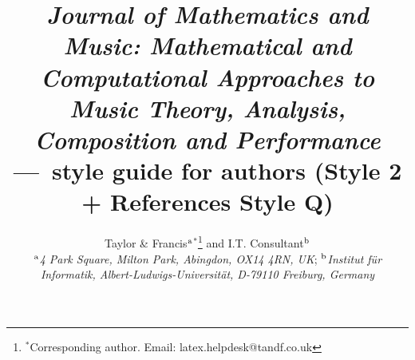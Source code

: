 \documentclass[]{tMAM2e}
\begin{document}
  

    



\title{{\itshape Journal of Mathematics and Music: Mathematical and Computational Approaches to Music Theory, Analysis, Composition and Performance}---\LaTeXe\ style guide for authors (Style 2 + References Style Q)}

\author{Taylor \& Francis$^{\rm a}$$^{\ast}$\thanks{$^\ast$Corresponding author. Email: latex.helpdesk@tandf.co.uk
\vspace{6pt}} and I.T. Consultant$^{\rm b}$\\\vspace{9pt}  $^{\rm a}${\em{4 Park Square, Milton Park, Abingdon,
OX14 4RN, UK}}; $^{\rm b}${\em{Institut f\"{u}r Informatik, Albert-Ludwigs-Universit\"{a}t, D-79110 Freiburg,
Germany}}\\\vspace{9pt} }
\end{document}
